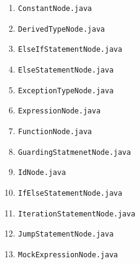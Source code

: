 \documentclass{report}
\begin{document}
\begin{itemize}
\begin{enumerate}
\begin{quotation}
\end{quotation}
\item \texttt{ConstantNode.java}
\begin{quotation}
\noindent 
\end{quotation}
\item \texttt{DerivedTypeNode.java}
\begin{quotation}
\noindent 
\end{quotation}
\item \texttt{ElseIfStatementNode.java}
\begin{quotation}
\noindent 
\end{quotation}
\item \texttt{ElseStatementNode.java}
\begin{quotation}
\noindent 
\end{quotation}
\item \texttt{ExceptionTypeNode.java}
\begin{quotation}
\noindent 
\end{quotation}
\item \texttt{ExpressionNode.java}
\begin{quotation}
\noindent 
\end{quotation}
\item \texttt{FunctionNode.java}
\begin{quotation}
\noindent 
\end{quotation}
\item \texttt{GuardingStatmenetNode.java}
\begin{quotation}
\noindent 
\end{quotation}
\item \texttt{IdNode.java}
\begin{quotation}
\noindent 
\end{quotation}
\item \texttt{IfElseStatementNode.java}
\begin{quotation}
\noindent 
\end{quotation}
\item \texttt{IterationStatementNode.java}
\begin{quotation}
\noindent 
\end{quotation}
\item \texttt{JumpStatementNode.java}
\begin{quotation}
\noindent 
\end{quotation}
\item \texttt{MockExpressionNode.java}
\begin{quotation}

\end{quotation}
\end{enumerate}
\end{itemize}
\end{document}
